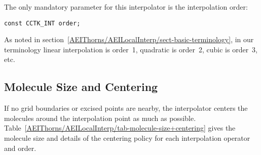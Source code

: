 The only mandatory parameter for this interpolator is the interpolation
order:
\begin{verbatim}
const CCTK_INT order;
\end{verbatim}
As noted in section~\ref{AEIThorns/AEILocalInterp/sect-basic-terminology},
in our terminology linear interpolation is order~1, quadratic is
order~2, cubic is order~3, etc.


\subsection{Molecule Size and Centering}
\label{AEIThorns/AEILocalInterp/sect-molecule-size+centering}

If no grid boundaries or excised points are nearby, the interpolator
centers the molecules around the interpolation point as much as possible.
Table~\ref{AEIThorns/AEILocalInterp/tab-molecule-size+centering} gives the molecule
size and details of the centering policy for each interpolation operator
and order.


